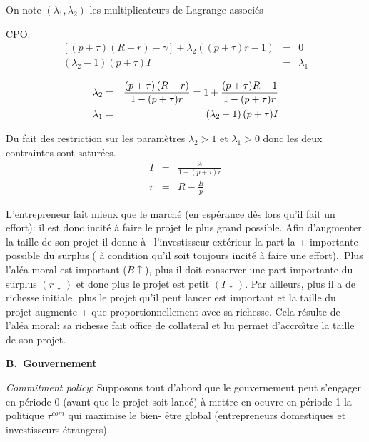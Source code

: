 \documentclass[a4paper]{article}
\begin{document}
On note $\left( \lambda _{1},\lambda _{2}\right) $ les multiplicateurs de
Lagrange associ\'{e}s

CPO:%
\begin{eqnarray*}
\left[ (p+\tau )\left( R-r\right) -\gamma \right] +\lambda _{2}((p+\tau
)r-1) &=&0 \\
\left( \lambda _{2}-1\right) (p+\tau )I &=&\lambda _{1}
\end{eqnarray*}

\begin{eqnarray*}
\lambda _{2} &=&\frac{(p+\tau )\left( R-r\right) }{1-(p+\tau )r}=1+\frac{%
(p+\tau )R-1}{1-(p+\tau )r} \\
\lambda _{1} &=&\left( \lambda _{2}-1\right) (p+\tau )I
\end{eqnarray*}

Du fait des restriction sur les param\`{e}tres $\lambda _{2}>1$ et $\lambda
_{1}>0$ donc les deux contraintes sont satur\'{e}es.%
\begin{eqnarray*}
I &=&\frac{A}{1-(p+\tau )r} \\
r &=&R-\frac{B}{p}
\end{eqnarray*}

L'entrepreneur fait mieux que le march\'{e} (en esp\'{e}rance d\`{e}s lors
qu'il fait un effort): il est donc incit\'{e} \`{a} faire le projet le plus
grand possible. Afin d'augmenter la taille de son projet il donne \`{a} \
l'investisseur ext\'{e}rieur la part la + importante possible du surplus (%
\`{a} condition qu'il soit toujours incit\'{e} \`{a} faire une effort).\
Plus l'al\'{e}a moral est important ($B\uparrow $), plus il doit conserver
une part importante du surplus $(r\downarrow )$ et donc plus le projet est
petit $(I\downarrow )$. Par ailleurs, plus il a de richesse initiale, plus
le projet qu'il peut lancer est important et la taille du projet augmente +
que proportionnellement avec sa richesse. Cela r\'{e}sulte de l'al\'{e}a
moral: sa richesse fait office de collateral et lui permet d'accro\^{\i}tre
la taille de son projet.

\bigskip

\textbf{B.\ Gouvernement}

\bigskip

\textit{Commitment policy}: Supposons tout d'abord que le gouvernement peut
s'engager en p\'{e}riode 0 (avant que le projet soit lanc\'{e}) \`{a} mettre
en oeuvre en p\'{e}riode 1 la politique $\tau ^{com}$ qui maximise le bien-%
\^{e}tre global (entrepreneurs domestiques et investisseurs \'{e}trangers).
\end{document}
